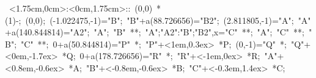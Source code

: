 %


\hbox{
\xy    <1.75cm,0cm>:<0cm,1.75cm>::
       (0,0) *\ellipse(1){-}; (0,0); 
       (-1.022475,-1)="B"; "B"+a(88.726656)="B2"; 
       (2.811805,-1)="A"; "A"+a(140.844814)="A2"; 
       "A"; "B" **\dir{-}; 
       {"A";"A2":"B";"B2",x}="C" **\dir{-}; 
       "A"; "C" **\dir{-}; 
       "B"; "C" **\dir{-}; 
       0+a(50.844814)="P" *{\bullet}; "P"+<1em,0.3ex> *{P};
       (0,-1)="Q" *{\bullet}; "Q"+<0em,-1.7ex> *{Q};
       0+a(178.726656)="R" *{\bullet}; "R"+<-1em,0ex> *{R};
       "A"+<0.8em,-0.6ex> *{A};
       "B"+<-0.8em,-0.6ex> *{B};
       "C"+<-0.3em,1.4ex> *{C};
\endxy}



